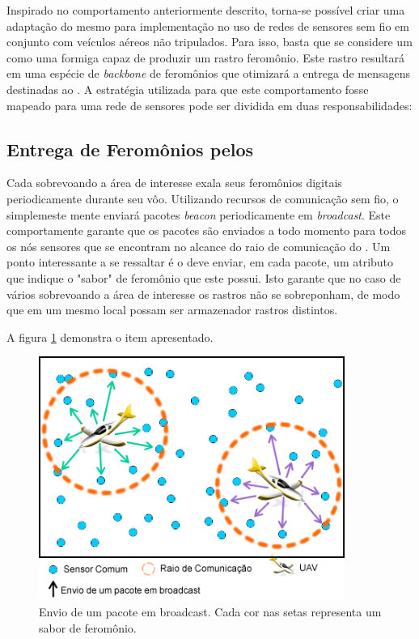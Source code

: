 Inspirado no comportamento anteriormente descrito, torna-se possível criar uma adaptação do mesmo para implementação no uso de redes de sensores sem fio em conjunto com veículos aéreos não tripulados. Para isso, basta que se considere um \vant como uma formiga capaz de produzir um rastro feromônio. Este rastro resultará em uma espécie de \emph{backbone} de feromônios que otimizará a entrega de mensagens destinadas ao \vant. A estratégia utilizada para que este comportamento fosse mapeado para uma rede de sensores pode ser dividida em duas responsabilidades:

\subsection{Entrega de Feromônios pelos \vants}
Cada \vant sobrevoando a área de interesse exala seus feromônios digitais periodicamente durante seu vôo. Utilizando recursos de comunicação sem fio, o \vant simplemeste mente enviará pacotes \emph{beacon} periodicamente em \emph{broadcast}. Este comportamente garante que os pacotes são enviados a todo momento para todos os nós sensores que se encontram no alcance do raio de comunicação do \vant. Um ponto interessante a se ressaltar é o \vant deve enviar, em cada pacote, um atributo que indique o "sabor" de feromônio que este \vant possui. Isto garante que no caso de vários \vants sobrevoando a área de interesse os rastros não se sobreponham, de modo que em um mesmo local possam ser armazenador rastros distintos.

A figura \ref{fig:broadcast} demonstra o item apresentado.

 \begin{figure}[h!]
 \centering
 \includegraphics[width=10cm]{pictures/broadcast.png}
 \caption{Envio de um pacote em broadcast. Cada cor nas setas representa um sabor de feromônio.}
  \label{fig:broadcast}
 \end{figure}

